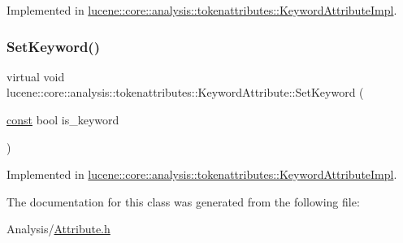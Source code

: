Implemented in \mbox{\hyperlink{classlucene_1_1core_1_1analysis_1_1tokenattributes_1_1KeywordAttributeImpl_aa98aa28fbea635057a71d0129cb92a2e}{lucene\+::core\+::analysis\+::tokenattributes\+::\+Keyword\+Attribute\+Impl}}.

\mbox{\label{classlucene_1_1core_1_1analysis_1_1tokenattributes_1_1KeywordAttribute_aee23c674ba6af03521985734f739c9d5}} 
\subsubsection{\texorpdfstring{Set\+Keyword()}{SetKeyword()}}
{\footnotesize\ttfamily virtual void lucene\+::core\+::analysis\+::tokenattributes\+::\+Keyword\+Attribute\+::\+Set\+Keyword (\begin{DoxyParamCaption}\item[{\mbox{\hyperlink{ZlibCrc32_8h_a2c212835823e3c54a8ab6d95c652660e}{const}} bool}]{is\+\_\+keyword }\end{DoxyParamCaption})\hspace{0.3cm}{\ttfamily [pure virtual]}}



Implemented in \mbox{\hyperlink{classlucene_1_1core_1_1analysis_1_1tokenattributes_1_1KeywordAttributeImpl_a1cae85f0e103d3dfa054c1a42e119de2}{lucene\+::core\+::analysis\+::tokenattributes\+::\+Keyword\+Attribute\+Impl}}.



The documentation for this class was generated from the following file\+:\begin{DoxyCompactItemize}
\item 
Analysis/\mbox{\hyperlink{Analysis_2Attribute_8h}{Attribute.\+h}}\end{DoxyCompactItemize}
